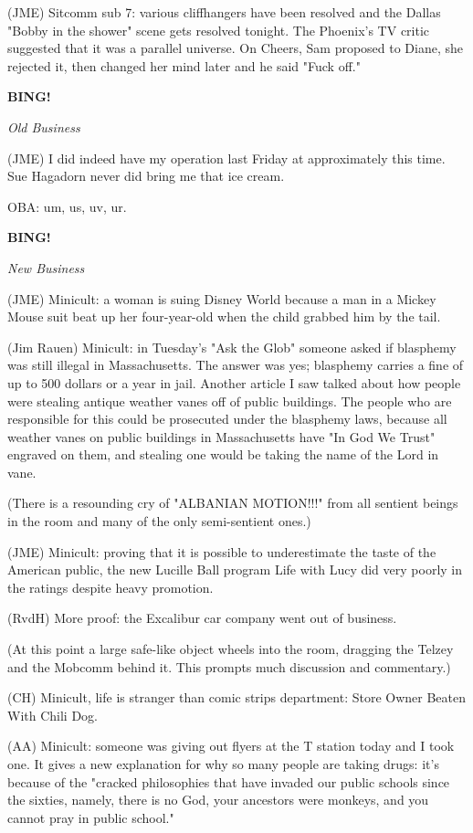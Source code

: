 \documentclass[12pt]{article}
\newcommand{\bing}{{\bf BING!} }
\newcommand{\goto}[1]{\bing \vskip 12pt \centerline{{\em{#1}}}}
\begin{document}
(JME) Sitcomm sub 7: various cliffhangers have been resolved and the Dallas "Bobby in the shower" scene gets resolved tonight. The Phoenix's TV critic suggested that it was a parallel universe. On Cheers, Sam proposed to Diane, she rejected it, then changed her mind later and he said "Fuck off."

\goto{Old Business}

(JME) I did indeed have my operation last Friday at approximately this time. Sue Hagadorn never did bring me that ice cream.

OBA: um, us, uv, ur.

\goto{New Business}

(JME) Minicult: a woman is suing Disney World because a man in a Mickey Mouse suit beat up her four-year-old when the child grabbed him by the tail.

(Jim Rauen) Minicult: in Tuesday's "Ask the Glob" someone asked if blasphemy was still illegal in Massachusetts. The answer was yes; blasphemy carries a fine of up to 500 dollars or a year in jail. Another article I saw talked about how people were stealing antique weather vanes off of public buildings. The people who are responsible for this could be prosecuted under the blasphemy laws, because all weather vanes on public buildings in Massachusetts have "In God We Trust" engraved on them, and stealing one would be taking the name of the Lord in vane.

(There is a resounding cry of "ALBANIAN MOTION!!!" from all sentient beings in the room and many of the only semi-sentient ones.)

(JME) Minicult: proving that it is possible to underestimate the taste of the American public, the new Lucille Ball program Life with Lucy did very poorly in the ratings despite heavy promotion.

(RvdH) More proof: the Excalibur car company went out of business.

(At this point a large safe-like object wheels into the room, dragging the Telzey and the Mobcomm behind it. This prompts much discussion and commentary.)

(CH) Minicult, life is stranger than comic strips department: Store Owner Beaten With Chili Dog.

(AA) Minicult: someone was giving out flyers at the T station today and I took one. It gives a new explanation for why so many people are taking drugs: it's because of the "cracked philosophies that have invaded our public schools since the sixties, namely, there is no God, your ancestors were monkeys, and you cannot pray in public school."
\end{document}
